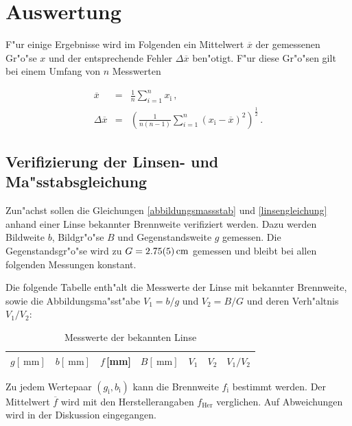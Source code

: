 \section{Auswertung}
	\label{sec:auswertung}

	F"ur einige Ergebnisse wird im Folgenden ein Mittelwert $\overline{x}$ der gemessenen Gr"o"se $x$ und der entsprechende Fehler $\Delta \overline{x}$ ben"otigt.
	F"ur diese Gr"o"sen gilt bei einem Umfang von $n$ Messwerten

	\begin{eqnarray*}
		\overline{x} & = & \frac{1}{n} \sum_{i=1}^{n}{x_\mathrm{i}} \, , \\
		\Delta \overline{x} & = & \left(\frac{1}{n (n-1)} \sum_{i = 1}^{n}{{\left(x_\mathrm{i} - \overline{x}\right)}^2}\right)^\frac{1}{2} \, .
	\end{eqnarray*}

	\subsection{Verifizierung der Linsen- und Ma"sstabsgleichung}
		\label{subsec:verifizierung}
		Zun"achst sollen die Gleichungen \eqref{abbildungsmassstab} und \eqref{linsengleichung} anhand einer Linse bekannter Brennweite verifiziert werden.
		Dazu werden Bildweite $b$, Bildgr"o"se $B$ und Gegenstandsweite $g$ gemessen.
		Die Gegenstandsgr"o"se wird zu $G = \SI{2.75 (5)}{\centi \meter}$ gemessen und bleibt bei allen folgenden Messungen konstant.

		Die folgende Tabelle enth"alt die Messwerte der Linse mit bekannter Brennweite, sowie die Abbildungsma"sst"abe $V_1 = b/g$ und $V_2 = B/G$ und deren Verh"altnis $V_1/V_2$:

		\begin{table}[!h]
			\begin{center}
				\label{tabelle:bekannt}
				\caption{Messwerte der bekannten Linse}
				\begin{tabular}{|c|c|c|c|c|c|c|}
					\hline 
					$g [\SI{}{\milli \meter}]$ & $b [\SI{}{\milli \meter}]$ & $f$\,[mm] & $B [\SI{}{\milli \meter}]$ & $V_1$ & $V_2$ & $V_1/V_2$ \\
					\hline 
					\hline
					
					\hline 
				\end{tabular}
			\end{center}
		\end{table}

		Zu jedem Wertepaar $(g_\mathrm{i}, b_\mathrm{i})$ kann die Brennweite $f_\mathrm{i}$ bestimmt werden.
		Der Mittelwert $\overline{f}$ wird mit den Herstellerangaben $f_\mathrm{Her}$ verglichen.
		Auf Abweichungen wird in der Diskussion eingegangen.

